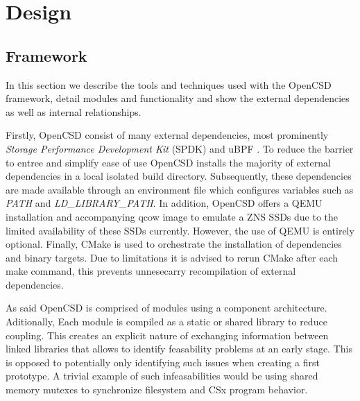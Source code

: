 
\chapter{Design} %



\ifpdf
    \graphicspath{{7/figures/PNG/}{7/figures/PDF/}{7/figures/}}
\else
    \graphicspath{{7/figures/EPS/}{7/figures/}}
\fi


% 

\section{Framework}

In this section we describe the tools and techniques used with the OpenCSD
framework, detail modules and functionality and show the external dependencies
as well as internal relationships.

Firstly, OpenCSD consist of many external dependencies, most prominently
\textit{Storage Performance Development Kit} (SPDK) \cite{spdk} and uBPF
\cite{ubpf}. To reduce the barrier to entree and simplify ease of use OpenCSD
installs the majority of external dependencies in a local isolated build
directory. Subsequently, these dependencies are made available through an
environment file which configures variables such as \textit{PATH} and
\textit{LD\_LIBRARY\_PATH}. In addition, OpenCSD offers a QEMU installation and
accompanying qcow image to emulate a ZNS SSDs due to the limited availability of
these SSDs currently. However, the use of QEMU is entirely optional. Finally,
CMake \cite{cmake} is used to orchestrate the installation of dependencies and
binary targets. Due to limitations it is advised to rerun CMake after each make
command, this prevents unnesecarry recompilation of external
dependencies\footnotemark[9].


As said OpenCSD is comprised of modules using a component architecture.
Aditionally, Each module is compiled as a static or shared library to reduce
coupling. This creates an explicit nature of exchanging information between
linked libraries that allows to identify feasability problems at an early stage.
This is opposed to potentially only identifying such issues when creating a
first prototype. A trivial example of such infeasabilities would be using shared
memory mutexes to synchronize filesystem and CSx program behavior.

